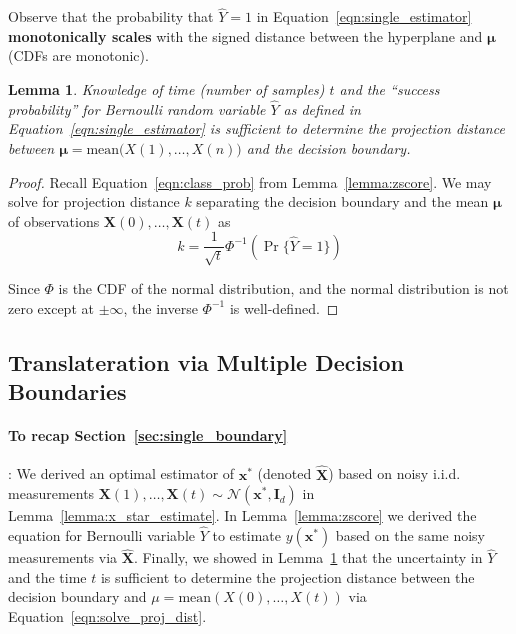 \documentclass[12pt]{article}
\newtheorem{lemma}{Lemma}
\begin{document}
Observe that the probability that $\hat Y = 1$ in Equation~\ref{eqn:single_estimator} \textbf{monotonically scales} with the signed distance between the hyperplane and $\mathbf \mu$ (CDFs are monotonic). 

\begin{lemma}
	\label{lemma:prob_to_dist}
	Knowledge of time (number of samples) $t$ and the ``success probability'' for Bernoulli random variable $\hat Y$ as defined in Equation~\ref{eqn:single_estimator} is sufficient to determine the projection distance between $\mathbf \mu = \text{mean}\big(X(1), \dots, X(n)\big)$ and the decision boundary. 
\end{lemma}
\begin{proof}
	Recall Equation~\ref{eqn:class_prob} from Lemma~\ref{lemma:zscore}. 
	We may solve for projection distance $k$ separating the decision boundary and the mean $\mathbf \mu$ of observations $\mathbf X(0), \dots, \mathbf X(t)$ as 
	\begin{equation}
		\label{eqn:solve_proj_dist}
		k = \frac{1}{\sqrt t}\Phi^{-1}(\Pr\{\hat Y = 1\})
	\end{equation}

	Since $\Phi$ is the CDF of the normal distribution, and the normal distribution is not zero except at $\pm \infty$, the inverse $\Phi^{-1}$ is well-defined.
\end{proof}


\subsection{Translateration via Multiple Decision Boundaries}

\paragraph{To recap Section~\ref{sec:single_boundary}}: We derived an optimal estimator of $\mathbf x^*$ (denoted $\hat{\mathbf X}$) based on noisy i.i.d. measurements $\mathbf X(1), \dots, \mathbf X(t) \sim \mathcal N(\mathbf x^*, \mathbf I_d)$ in Lemma~\ref{lemma:x_star_estimate}. 
In Lemma~\ref{lemma:zscore} we derived the equation for Bernoulli variable $\hat Y$ to estimate $y(\mathbf x^*)$ based on the same noisy measurements via $\hat{\mathbf X}$.
Finally, we showed in Lemma~\ref{lemma:prob_to_dist} that the uncertainty in $\hat Y$ and the time $t$ is sufficient to determine the projection distance between the decision boundary and $\mu = \text{mean}(X(0), \dots, X(t))$ via Equation~\ref{eqn:solve_proj_dist}. \\
\end{document}
